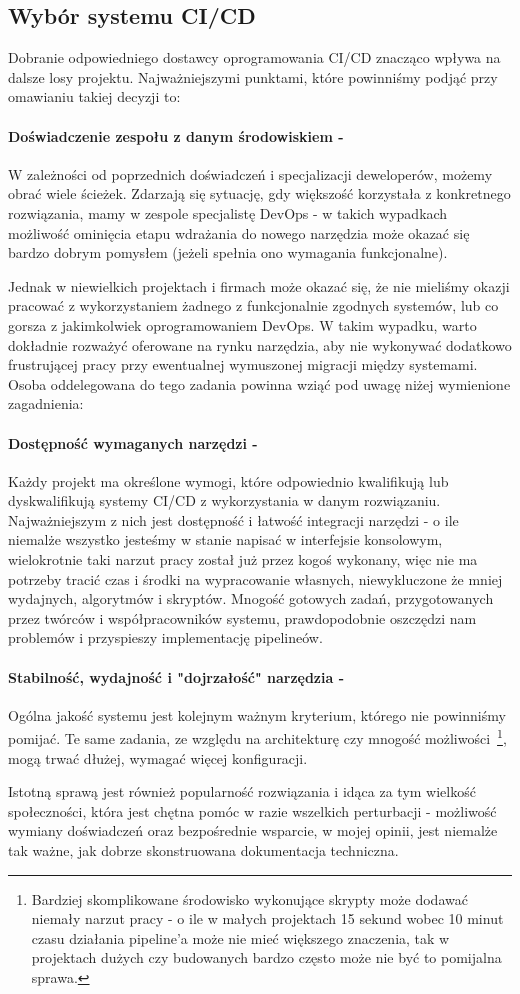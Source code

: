 \subsection{Wybór systemu CI/CD}

Dobranie odpowiedniego dostawcy oprogramowania CI/CD znacząco wpływa 
na dalsze losy projektu. Najważniejszymi punktami, które powinniśmy 
podjąć przy omawianiu takiej decyzji to:


\paragraph{Doświadczenie zespołu z danym środowiskiem -} 
W zależności od poprze\-dnich doświadczeń i specjalizacji deweloperów, 
możemy obrać wiele ścieżek. Zdarzają się sytuację, gdy większość korzystała 
z konkretnego rozwiązania, mamy w zespole specjalistę DevOps 
- w takich wypadkach możliwość ominięcia etapu wdrażania do nowego narzędzia 
może okazać się bardzo dobrym pomysłem (jeżeli spełnia ono wymagania funkcjonalne).

Jednak w niewielkich projektach i firmach może okazać się, że nie 
mieliśmy okazji pracować z wykorzy\-staniem żadnego z funkcjonalnie zgodnych 
systemów, lub co gorsza z jakimkolwiek oprogramowaniem DevOps. 
W takim wypadku, warto dokładnie rozważyć oferowane na rynku narzędzia, 
aby nie wykonywać dodatkowo frustrującej pracy przy ewentualnej wymuszonej 
migracji między systemami. \\
Osoba oddelegowana do tego zadania powinna wziąć pod 
uwagę niżej wymienione zagadnienia:


\paragraph{Dostępność wymaganych narzędzi -}
Każdy projekt ma określone wymogi, które odpowiednio kwalifikują lub 
dyskwalifikują systemy CI/CD z wykorzystania w danym rozwiązaniu.
Najważniejszym z nich jest dostępność i łatwość integracji narzędzi - 
o ile niemalże wszystko jesteśmy w stanie napisać w interfejsie konsolowym, 
wielokrotnie taki narzut pracy został już przez kogoś wykonany, więc nie ma 
potrzeby tracić czas i środki na wypracowanie własnych, niewykluczone że mniej 
wydajnych, algorytmów i skryptów. Mnogość gotowych zadań, przygotowanych 
przez twórców i współpracowników systemu, prawdopodobnie oszczędzi nam 
problemów i przyspieszy implementację pipelineów.


\paragraph{Stabilność, wydajność i "dojrzałość" narzędzia -}
Ogólna jakość systemu jest kolejnym ważnym kryterium, którego nie powinniśmy 
pomijać. Te same zadania, ze względu na architekturę czy mnogość możliwości~\footnote{%
    Bardziej skomplikowane środowisko wykonujące skrypty może dodawać niemały narzut 
    pracy - o ile w małych projektach 15 sekund wobec 10 minut czasu działania pipeline'a może 
    nie mieć większego znaczenia, tak w projektach dużych czy budowanych bardzo często 
    może nie być to pomijalna sprawa.
}, 
mogą trwać dłużej, wymagać więcej konfiguracji. 

Istotną sprawą jest również popularność rozwiązania i idąca za tym wielkość społeczności, 
która jest chętna pomóc w razie wszelkich perturbacji - możliwość wymiany 
doświadczeń oraz bezpośrednie wsparcie, w mojej opinii, jest niemalże tak ważne, 
jak dobrze skonstruowana dokumentacja techniczna.
